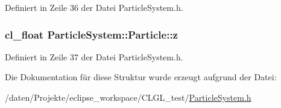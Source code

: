 Definiert in Zeile 36 der Datei Particle\-System.\-h.

\hypertarget{structParticleSystem_1_1Particle_a2e9fdcdb5010bf8c25c713444c49d6aa}{
\subsubsection[{z}]{\setlength{\rightskip}{0pt plus 5cm}cl\-\_\-float Particle\-System\-::\-Particle\-::z}}\label{structParticleSystem_1_1Particle_a2e9fdcdb5010bf8c25c713444c49d6aa}


Definiert in Zeile 37 der Datei Particle\-System.\-h.



Die Dokumentation für diese Struktur wurde erzeugt aufgrund der Datei\-:\begin{DoxyCompactItemize}
\item 
/daten/\-Projekte/eclipse\-\_\-workspace/\-C\-L\-G\-L\-\_\-test/\hyperlink{CLGL__test_2ParticleSystem_8h}{Particle\-System.\-h}\end{DoxyCompactItemize}
